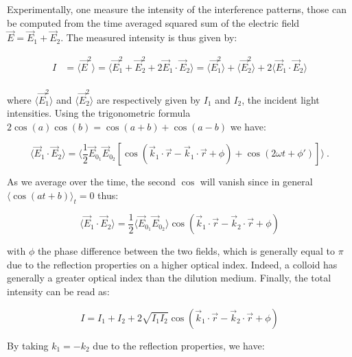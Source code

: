 Experimentally, one measure the intensity of the interference patterns, those can be computed from the time averaged squared sum of the electric field $\vec{E} = \vec{E}_1 + \vec{E}_2$. The measured intensity is thus given by:

\begin{equation}
	\begin{aligned}
		I & = \langle \vec{E}^2 \rangle = \langle \vec{E}_1^2 + \vec{E}_2^2 + 2\vec{E}_1 \cdot \vec{E}_2 \rangle 
		= \langle \vec{E}_1^2 \rangle + \langle \vec{E}_2^2 \rangle  + 2 \langle \vec{E}_1 \cdot \vec{E}_2 \rangle \\
	\end{aligned}
\end{equation} 

where $ \langle \vec{E}_1^2 \rangle $ and  $\langle \vec{E}_2^2 \rangle$ are respectively given by $I_1$ and $I_2$, the incident light intensities. Using the trigonometric formula $2 \cos (a)\cos (b) = \cos (a+b) + \cos (a-b) $ we have:

\begin{equation}
	\langle  
	\vec{E}_1 \cdot \vec{E}_2 \rangle = 
	\langle
	\frac{1}{2} \vec{E}_{0_1}  \vec{E}_{0_2} 
	\left[
		\cos 
		\left(
			\vec{k}_1 \cdot \vec{r} - \vec{k}_1 \cdot \vec{r} + \phi	
		\right)	
		+ 
		\cos
		\left(
			2\omega t + \phi'
		\right)
	\right]
	\rangle~.
\end{equation}

As we average over the time, the second $\cos$ will vanish since in general $\langle \cos(at + b) \rangle_ t = 0$ thus:

\begin{equation}
	\langle \vec{E}_1 \cdot \vec{E}_2 \rangle = \frac{1}{2} \langle  \vec{E}_{0_1}  \vec{E}_{0_2} \rangle
	\cos 
	\left(
	\vec{k}_1 \cdot \vec{r} - \vec{k}_2 \cdot \vec{r} + \phi	
	\right)	
\end{equation}

with $\phi$ the phase difference between the two fields, which is generally equal to $\pi$ due to the reflection properties on a higher optical index. Indeed, a colloid has generally a greater optical index than the dilution medium.  Finally, the total intensity can be read as:


\begin{equation}
	I = I_1 + I_2 + 2 \sqrt{I_1 I_2} 
	\cos 
	\left(
	\vec{k}_1 \cdot \vec{r} - \vec{k}_2 \cdot \vec{r} + \phi	
	\right)
\end{equation}

By taking $k_1 = - k_2$ due to the reflection properties, we have:



